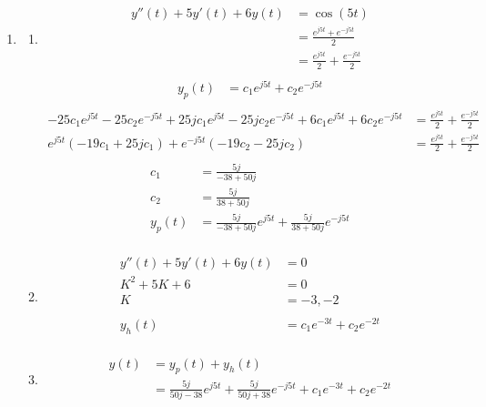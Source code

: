 \documentclass[10pt,a4paper, margin=1in]{article}
\begin{document}
\begin{enumerate}
\item %
    \begin{enumerate}
    \item %
    \begin{align*}
        y''(t) + 5y'(t) + 6y(t) & = \cos(5t)\\
        & = \frac{e^{j5t} + e^{-j5t}}{2}\\
        & = \frac{e^{j5t}}{2} + \frac{e^{-j5t}}{2}\\
    \end{align*}
    \begin{align*}
        y_p(t) & = c_1e^{j5t} + c_2e^{-j5t}\\
    \end{align*}
    \begin{align*}
        -25c_1e^{j5t} - 25c_2e^{-j5t} + 25jc_1e^{j5t} - 25jc_2e^{-j5t} + 6c_1e^{j5t} + 6c_2e^{-j5t} & = \frac{e^{j5t}}{2} + \frac{e^{-j5t}}{2}\\
        e^{j5t} \left(-19c_1 + 25jc_1\right) + e^{-j5t} \left(-19c_2 - 25jc_2\right) & = \frac{e^{j5t}}{2} + \frac{e^{-j5t}}{2}\\
    \end{align*}
    \begin{align*}
        c_1 & = \frac{5j}{-38 + 50j} \\
        c_2 & = \frac{5j}{38 + 50j} \\
        y_p(t) & = \frac{5j}{-38 + 50j}e^{j5t} + \frac{5j}{38 + 50j}e^{-j5t}\\
    \end{align*}
    \item %
    \begin{align*}
        y''(t) + 5y'(t) + 6y(t) & = 0\\
        K^2 + 5K + 6 & = 0\\
        K & = -3, -2\\
        & \\
        y_h(t) & = c_1e^{-3t} + c_2e^{-2t}\\
    \end{align*}
	\item %
    \begin{align*}
        y(t) & = y_p(t) + y_h(t)\\
        & = \frac{5j}{50j - 38}e^{j5t} + \frac{5j}{50j + 38}e^{-j5t} + c_1e^{-3t} + c_2e^{-2t}\\
    \end{align*}

\end{enumerate}
\end{enumerate}
\end{document}
